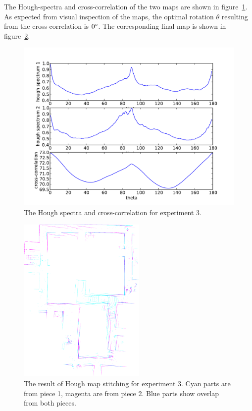 The Hough-spectra and cross-correlation of the two maps are shown in figure~\ref{fig:map4-hough}. As expected from visual inspection of the maps, the optimal rotation $\theta$ resulting from the cross-correlation is $0\degree$. The corresponding final map is shown in figure~\ref{fig:map4-result}.

\begin{figure}[ht]
\centering
  \includegraphics[width=\textwidth]{images/experiment/map4/hough.pdf}
  \caption{The Hough spectra and cross-correlation for experiment 3.}
  \label{fig:map4-hough}
\end{figure}

\begin{figure}[ht]
\centering
  \includegraphics[width=0.55\textwidth]{images/experiment/map4/results/result_color_0.png}
  \caption{The result of Hough map stitching for experiment 3. Cyan parts are from piece 1, magenta are from piece 2. Blue parts show overlap from both pieces.}
  \label{fig:map4-result}
\end{figure}

